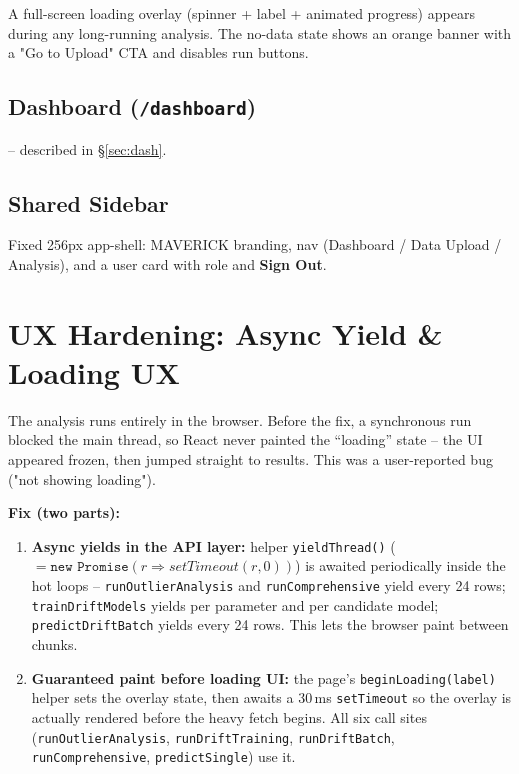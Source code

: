 \documentclass[11pt,a4paper]{article}
\newcommand{\code}[1]{\texttt{\small #1}}
\begin{document}
A full-screen loading overlay (spinner + label + animated progress) appears during any
long-running analysis. The no-data state shows an orange banner with a "Go to Upload" CTA and
disables run buttons.

\subsection{Dashboard (\code{/dashboard})} -- described in \S\ref{sec:dash}.

\subsection{Shared Sidebar}
Fixed 256px app-shell: MAVERICK branding, nav (Dashboard / Data Upload / Analysis), and a user
card with role and \textbf{Sign Out}.

\section{UX Hardening: Async Yield \& Loading UX}
\label{sec:ux}

The analysis runs entirely in the browser. Before the fix, a synchronous run blocked the main
thread, so React never painted the ``loading'' state -- the UI appeared frozen, then jumped
straight to results. This was a user-reported bug ("not showing loading").

\textbf{Fix (two parts):}
\begin{enumerate}[leftmargin=1.5em]
  \item \textbf{Async yields in the API layer:} helper
        \code{yieldThread()} ($=\texttt{new Promise}(r\Rightarrow setTimeout(r,0))$) is awaited
        periodically inside the hot loops --
        \code{runOutlierAnalysis} and \code{runComprehensive} yield every 24 rows;
        \code{trainDriftModels} yields per parameter and per candidate model;
        \code{predictDriftBatch} yields every 24 rows. This lets the browser paint between
        chunks.
  \item \textbf{Guaranteed paint before loading UI:} the page's \code{beginLoading(label)}
        helper sets the overlay state, then awaits a 30\,ms \code{setTimeout} so the overlay is
        actually rendered before the heavy fetch begins. All six call sites
        (\code{runOutlierAnalysis}, \code{runDriftTraining}, \code{runDriftBatch},
        \code{runComprehensive}, \code{predictSingle}) use it.
\end{enumerate}
\end{document}

